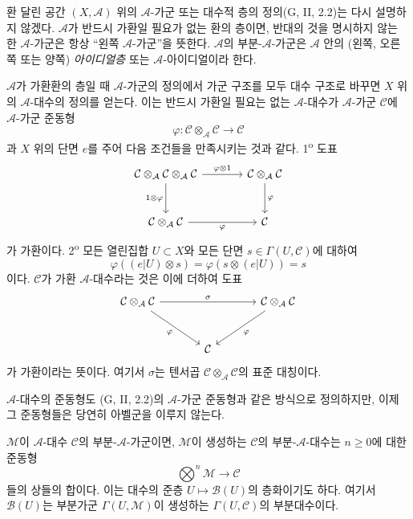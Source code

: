 \begin{env}[4.1.3]
\label{0.4.1.3-ko}
환 달린 공간 $(X,\mathcal A)$ 위의 $\mathcal A$-가군 또는 대수적 층의 정의(G, II, 2.2)는 다시 설명하지 않겠다. $\mathcal A$가 반드시 가환일 필요가 없는 환의 층이면, 반대의 것을 명시하지 않는 한 $\mathcal A$-가군은 항상 ``왼쪽 $\mathcal A$-가군''을 뜻한다. $\mathcal A$의 부분-$\mathcal A$-가군은 $\mathcal A$ 안의 (왼쪽, 오른쪽 또는 양쪽) \emph{아이디얼층} 또는 $\mathcal A$-아이디얼이라 한다.

$\mathcal A$가 가환환의 층일 때 $\mathcal A$-가군의 정의에서 가군 구조를 모두 대수 구조로 바꾸면 $X$ 위의 $\mathcal A$-대수의 정의를 얻는다. 이는 반드시 가환일 필요는 없는 $\mathcal A$-대수가 $\mathcal A$-가군 $\mathcal C$에 $\mathcal A$-가군 준동형
\[
  \varphi:
  \mathcal C\otimes_{\mathcal A}\mathcal C
  \longrightarrow\mathcal C
\]
과 $X$ 위의 단면 $e$를 주어 다음 조건들을 만족시키는 것과 같다. 1\textsuperscript{o} 도표
\[
\begin{tikzcd}[column sep=large,row sep=large]
\mathcal{C}\otimes_{\mathcal{A}}\mathcal{C}\otimes_{\mathcal{A}}\mathcal{C}
  \arrow[r,"\varphi\otimes 1"]
  \arrow[d,"1\otimes\varphi"']
&
\mathcal{C}\otimes_{\mathcal{A}}\mathcal{C}
  \arrow[d,"\varphi"]
\\
\mathcal{C}\otimes_{\mathcal{A}}\mathcal{C}
  \arrow[r,"\varphi"']
&
\mathcal{C}
\end{tikzcd}
\]
가 가환이다. 2\textsuperscript{o} 모든 열린집합 $U\subset X$와 모든 단면 $s\in\Gamma(U,\mathcal C)$에 대하여
\[
  \varphi((e|U)\otimes s)
  =\varphi(s\otimes(e|U))
  =s
\]
이다. $\mathcal C$가 가환 $\mathcal A$-대수라는 것은 이에 더하여 도표
\[
\begin{tikzcd}[column sep=large,row sep=large]
\mathcal{C}\otimes_{\mathcal{A}}\mathcal{C}
  \arrow[rr,"\sigma"]
  \arrow[dr,"\varphi"']
&&
\mathcal{C}\otimes_{\mathcal{A}}\mathcal{C}
  \arrow[dl,"\varphi"]
\\
& \mathcal{C} &
\end{tikzcd}
\]
가 가환이라는 뜻이다. 여기서 $\sigma$는 텐서곱 $\mathcal C\otimes_{\mathcal A}\mathcal C$의 표준 대칭이다.

$\mathcal A$-대수의 준동형도 (G, II, 2.2)의 $\mathcal A$-가군 준동형과 같은 방식으로 정의하지만, 이제 그 준동형들은 당연히 아벨군을 이루지 않는다.

$\mathcal M$이 $\mathcal A$-대수 $\mathcal C$의 부분-$\mathcal A$-가군이면, $\mathcal M$이 생성하는 $\mathcal C$의 부분-$\mathcal A$-대수는 $n\geqslant0$에 대한 준동형
\[
  \bigotimes^n\mathcal M\longrightarrow\mathcal C
\]
들의 상들의 합이다. 이는 대수의 준층 $U\mapsto\mathcal B(U)$의 층화이기도 하다. 여기서 $\mathcal B(U)$는 부분가군 $\Gamma(U,\mathcal M)$이 생성하는 $\Gamma(U,\mathcal C)$의 부분대수이다.
\end{env}

